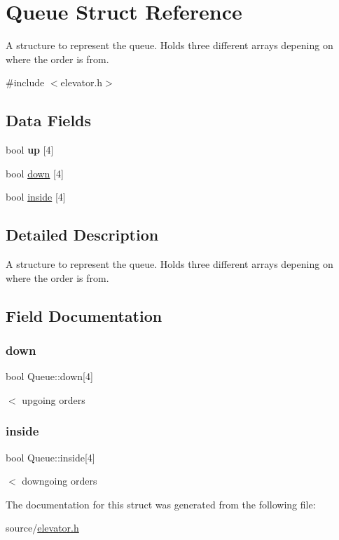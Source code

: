 \hypertarget{structQueue}{}\section{Queue Struct Reference}
\label{structQueue}


A structure to represent the queue. Holds three different arrays depening on where the order is from.  




{\ttfamily \#include $<$elevator.\+h$>$}

\subsection*{Data Fields}
\begin{DoxyCompactItemize}
\item 
\mbox{\label{structQueue_af69e098f53e880a6a37cfcdb490c21c1}} 
bool {\bfseries up} \mbox{[}4\mbox{]}
\item 
bool \hyperlink{structQueue_a6ca2efe2986823529fa0dcc8a2ade033}{down} \mbox{[}4\mbox{]}
\item 
bool \hyperlink{structQueue_a943a20da3b203b83fe3b32c53bf97a39}{inside} \mbox{[}4\mbox{]}
\end{DoxyCompactItemize}


\subsection{Detailed Description}
A structure to represent the queue. Holds three different arrays depening on where the order is from. 

\subsection{Field Documentation}
\mbox{\label{structQueue_a6ca2efe2986823529fa0dcc8a2ade033}} 
\subsubsection{\texorpdfstring{down}{down}}
{\footnotesize\ttfamily bool Queue\+::down\mbox{[}4\mbox{]}}

$<$ upgoing orders \mbox{\label{structQueue_a943a20da3b203b83fe3b32c53bf97a39}} 
\subsubsection{\texorpdfstring{inside}{inside}}
{\footnotesize\ttfamily bool Queue\+::inside\mbox{[}4\mbox{]}}

$<$ downgoing orders 

The documentation for this struct was generated from the following file\+:\begin{DoxyCompactItemize}
\item 
source/\hyperlink{elevator_8h}{elevator.\+h}\end{DoxyCompactItemize}
